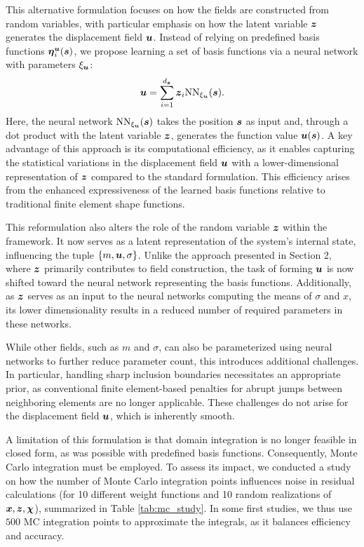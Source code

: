 This alternative formulation focuses on how the fields are constructed from random variables, with particular emphasis on how the latent variable $\boldsymbol{z}$ generates the displacement field $\boldsymbol{u}$. Instead of relying on predefined basis functions $\boldsymbol{\eta}^{\boldsymbol{u}}_i(\boldsymbol{s})$, we propose learning a set of basis functions via a neural network with parameters $\xi_{\boldsymbol{u}}$:
\begin{equation}
    \boldsymbol{u} = \sum_{i=1}^{d_{\boldsymbol{z}}} \boldsymbol{z}_i \mathrm{NN}_{\xi_{\boldsymbol{u}}}(\boldsymbol{s}).
\end{equation}
Here, the neural network $\mathrm{NN}_{\xi_{\boldsymbol{u}}}(\boldsymbol{s})$ takes the position $\boldsymbol{s}$ as input and, through a dot product with the latent variable $\boldsymbol{z}$, generates the function value $\boldsymbol{u}(\boldsymbol{s})$. A key advantage of this approach is its computational efficiency, as it enables capturing the statistical variations in the displacement field $\boldsymbol{u}$ with a lower-dimensional representation of $\boldsymbol{z}$ compared to the standard formulation. This efficiency arises from the enhanced expressiveness of the learned basis functions relative to traditional finite element shape functions.

This reformulation also alters the role of the random variable $\boldsymbol{z}$ within the framework. It now serves as a latent representation of the system’s internal state, influencing the tuple $\{ m, \boldsymbol{u}, \sigma \}$. Unlike the approach presented in Section 2, where $\boldsymbol{z}$ primarily contributes to field construction, the task of forming $\boldsymbol{u}$ is now shifted toward the neural network representing the basis functions. Additionally, as $\boldsymbol{z}$ serves as an input to the neural networks computing the means of $\sigma$ and $x$, its lower dimensionality results in a reduced number of required parameters in these networks.

While other fields, such as $m$ and $\sigma$, can also be parameterized using neural networks to further reduce parameter count, this introduces additional challenges. In particular, handling sharp inclusion boundaries necessitates an appropriate prior, as conventional finite element-based penalties for abrupt jumps between neighboring elements are no longer applicable. These challenges do not arise for the displacement field $\boldsymbol{u}$, which is inherently smooth.

A limitation of this formulation is that domain integration is no longer feasible in closed form, as was possible with predefined basis functions. Consequently, Monte Carlo integration must be employed. To assess its impact, we conducted a study on how the number of Monte Carlo integration points influences noise in residual calculations (for 10 different weight functions and 10 random realizations of $\boldsymbol{x}, \boldsymbol{z}, \boldsymbol{\chi}$), summarized in Table \ref{tab:mc_study}. In some first studies, we thus use $500$ MC integration points to approximate the integrals, as it balances efficiency and accuracy.

